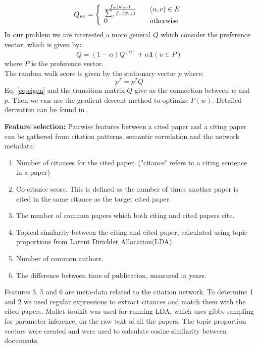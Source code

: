 \documentclass{article} %
\begin{document}
\[
  Q_{uv} = \left\{ 
  \begin{array}{l l}
    \frac{f_w(\psi_{uv})}{\sum_t f_w(\psi_{ut})} & \quad (u,v)\in E\\
    0 & \quad \text{otherwise}\\
  \end{array} \right.
\]
	In our problem we are interested a more general $Q$ which consider the preference vector, which is given by:
\begin{equation}
Q = (1 - \alpha) Q^{(0)} + \alpha \textbf{1}(u \in P)
\end{equation}
where $P$ is the preference vector. \\
The random walk score is given by the stationary vector $p$ where:
\begin{equation}
\label{eq:eigen}
p^T = p^TQ
\end{equation} 
	Eq. \ref{eq:eigen} and the transition matrix $Q$ give us the connection between $w$ and $p$. Then we can use the gradient descent method to optimize $F(w)$. Detailed derivation can be found in \cite{Backstrom:2011:SRW:1935826.1935914}.  

	\textbf{Feature selection:} Pairwise features  between a cited paper and a citing paper can be gathered from citation patterns, semantic correlation and the network metadata:
\begin{enumerate}
  \item Number of citances for the cited paper. ("citance" refers to a citing sentence in a paper)
  \item Co-citance score. This is defined as the number of times another paper is cited in the same citance as the target cited paper.
  \item The number of common papers which both citing and cited papers cite.
  \item Topical similarity between the citing and cited paper, calculated using topic proportions from Latent Dirichlet Allocation(LDA).
  \item Number of common authors.
  \item The difference between time of publication, measured in years.
\end{enumerate}
Features 3, 5 and 6 are meta-data related to the citation network. To determine 1 and 2 we used regular expressions to extract citances and match them with the cited papers. Mallet toolkit \cite{mallet} was used for running LDA, which uses gibbs sampling for parameter inference, on the raw text of all the papers. The topic proportion vectors were created and were used to calculate cosine similarity between documents.
\end{document}
